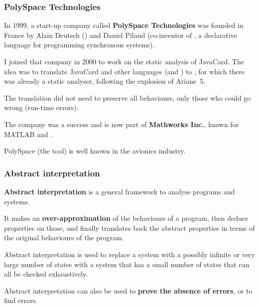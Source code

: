 \documentclass[compress,dvipdfmx]{beamer}
\begin{document}
\begin{frame}
  \frametitle{PolySpace Technologies}

  In 1999, a start-up company called \textbf{PolySpace Technologies}
  was founded in France by Alain Deutsch (\Inria) and Daniel Pilaud
  (co\hyp{}inventor of \Lustre, a declarative language for programming
  synchronous systems).

  \bigskip

  I joined that company in 2000 to work on the static analysis of
  JavaCard. The idea was to translate JavaCard and other languages
  (\Clang and \Cpp) to \Ada, for which there was already a static
  analyser, following the explosion of Ariane~5.

  \bigskip

  The translation did not need to preserve all behaviours, only those
  who could go wrong (run\hyp{}time errors).

  \bigskip

  The company was a success and is now part of \textbf{Mathworks
    Inc.}, known for MATLAB and \Simulink.

  \bigskip

  PolySpace (the tool) is well known in the avionics industry.

\end{frame}


\begin{frame}
  \frametitle{Abstract interpretation}

  \textbf{Abstract interpretation} is a general framework to analyse
  programs and systems.

  \bigskip

  It makes an \textbf{over\hyp{}approximation} of the behaviours of a
  program, then deduce properties on those, and finally translates
  back the abstract properties in terms of the original behaviours of
  the program.

  \bigskip

  Abstract interpretation is used to replace a system with a possibly
  infinite or very large number of states with a system that has a
  small number of states that can all be checked exhaustively.

  \bigskip

  Abstract interpretation can also be used to \textbf{prove the
    absence of errors}, or to find errors.

\end{frame}
\end{document}
